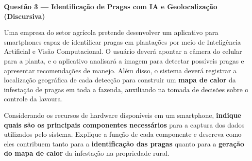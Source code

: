 \documentclass[12pt]{article}
\begin{document}
\noindent\textbf{Questão 3 — Identificação de Pragas com IA e Geolocalização (Discursiva)}

\vspace{0.3cm}
\noindent
Uma empresa do setor agrícola pretende desenvolver um aplicativo para smartphones capaz de
identificar pragas em plantações por meio de Inteligência Artificial e Visão Computacional.
O usuário deverá apontar a câmera do celular para a planta, e o aplicativo analisará a
imagem para detectar possíveis pragas e apresentar recomendações de manejo. Além disso, o
sistema deverá registrar a localização geográfica de cada detecção para construir um
\textbf{mapa de calor} da infestação de pragas em toda a fazenda, auxiliando na tomada de
decisões sobre o controle da lavoura.

\vspace{0.3cm}
\noindent
Considerando os recursos de hardware disponíveis em um smartphone, \textbf{indique quais são
os principais componentes necessários} para a captura dos dados utilizados pelo sistema.
Explique a função de cada componente e descreva como eles contribuem tanto para a
\textbf{identificação das pragas} quanto para a \textbf{geração do mapa de calor} da
infestação na propriedade rural.

\vspace{0.5cm}
\end{document}
